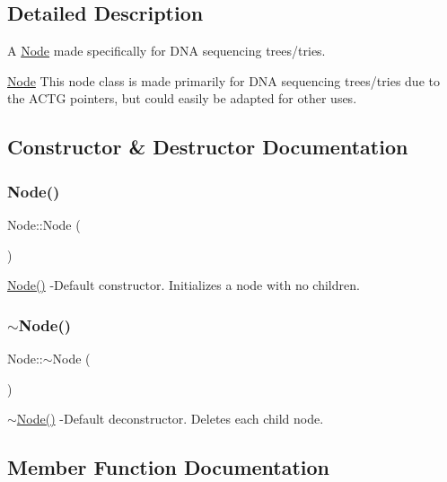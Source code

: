 \subsection{Detailed Description}
A \hyperlink{class_node}{Node} made specifically for D\+NA sequencing trees/tries. 

\hyperlink{class_node}{Node} This node class is made primarily for D\+NA sequencing trees/tries due to the A\+C\+TG pointers, but could easily be adapted for other uses. 

\subsection{Constructor \& Destructor Documentation}
\mbox{\label{class_node_ad7a34779cad45d997bfd6d3d8043c75f}} 
\subsubsection{\texorpdfstring{Node()}{Node()}}
{\footnotesize\ttfamily Node\+::\+Node (\begin{DoxyParamCaption}{ }\end{DoxyParamCaption})}

\hyperlink{class_node_ad7a34779cad45d997bfd6d3d8043c75f}{Node()} -\/\+Default constructor. Initializes a node with no children. \mbox{\label{class_node_aa0840c3cb5c7159be6d992adecd2097c}} 
\subsubsection{\texorpdfstring{$\sim$\+Node()}{~Node()}}
{\footnotesize\ttfamily Node\+::$\sim$\+Node (\begin{DoxyParamCaption}{ }\end{DoxyParamCaption})}

\hyperlink{class_node_aa0840c3cb5c7159be6d992adecd2097c}{$\sim$\+Node()} -\/\+Default deconstructor. Deletes each child node. 

\subsection{Member Function Documentation}
\mbox{\label{class_node_a7d2c9441ae9f243e06d9f081bada8bad}} 
